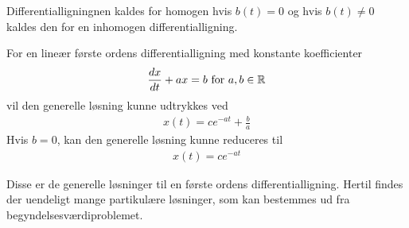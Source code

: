 Differentialligningnen kaldes for homogen hvis $b(t) = 0$ og hvis $b(t) \neq 0$ kaldes den for en inhomogen differentialligning. 

For en lineær første ordens differentialligning med konstante koefficienter
\begin{align}\label{eq:første_ordens_differential_ligning_med_konstante_koefficienter}
    \frac{dx}{dt}+ax=b \text{ for } a,b \in \mathbb{R}
\end{align}
vil den generelle løsning kunne udtrykkes ved
\begin{align} \label{eq:løsning_til_inhomo_første_ordens}
    x(t)=ce^{-at}+\frac{b}{a}
\end{align}
Hvis $b=0$, kan den generelle løsning kunne reduceres til 
\begin{align}\label{eq:løsning_til_homo_første_ordens}
    x(t) = ce^{-at}
\end{align}

Disse er de generelle løsninger til en første ordens differentialligning. Hertil findes der uendeligt mange partikulære løsninger, som kan bestemmes ud fra begyndelsesværdiproblemet. 



